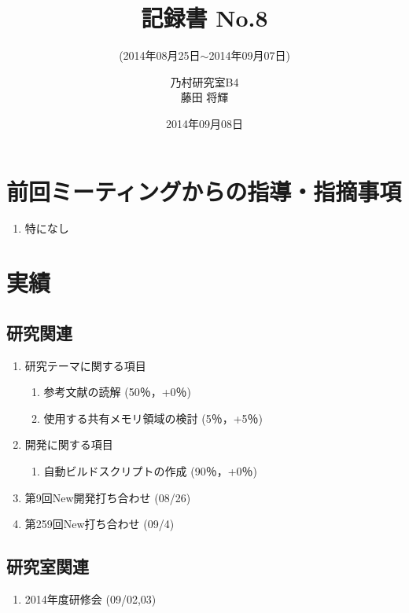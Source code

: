 \documentclass[fleqn, 14pt]{extarticle}
\subtitle{(2014年08月25日$\sim$2014年09月07日)}
\author{乃村研究室B4\\藤田 将輝}
\date{2014年09月08日}
\title{記録書 No.8}
\begin{document}
\maketitle




\section{前回ミーティングからの指導・指摘事項}
\label{sec-1}
\begin{enumerate}
\item 特になし
\newline
\hfill

\end{enumerate}




\section{実績}
\label{sec-2}

\subsection{研究関連}
\label{sec-2-1}
\begin{enumerate}
\item 研究テーマに関する項目
\hfill
\label{enum-research1}
\begin{enumerate}

\item 参考文献の読解
\hfill
\label{enum-1-A}
(50％，+0％)
\item 使用する共有メモリ領域の検討
\hfill
\label{enum-1-B}
(5％，+5％)
\end{enumerate}
\item 開発に関する項目
\hfill
\label{enum-research2}
\begin{enumerate}

\item 自動ビルドスクリプトの作成
\hfill
\label{enum-2-A}
(90％，+0％)
\end{enumerate}

\item 第9回New開発打ち合わせ
\hfill
\label{enum-3}
(08/26)
\item 第259回New打ち合わせ
\hfill
\label{enum-4}
(09/4)



\end{enumerate}

\subsection{研究室関連}
\label{sec-2-2}
\begin{enumerate}
\item 2014年度研修会
\hfill
\label{enum-lab2}
(09/02,03)
\end{enumerate}
\end{document}
